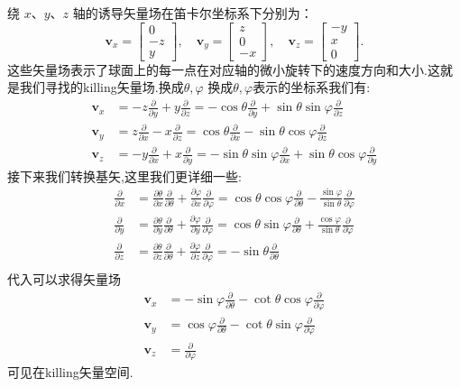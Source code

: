 \documentclass[../main.tex]{subfiles}
\begin{document}
绕 \(x\)、\(y\)、\(z\) 轴的诱导矢量场在笛卡尔坐标系下分别为：
\[
	\bm{v}_x = \begin{bmatrix}
		0  \\
		-z \\
		y
	\end{bmatrix}, \quad
	\bm{v}_y = \begin{bmatrix}
		z \\
		0 \\
		-x
	\end{bmatrix}, \quad
	\bm{v}_z = \begin{bmatrix}
		-y \\
		x  \\
		0
	\end{bmatrix}.
\]
这些矢量场表示了球面上的每一点在对应轴的微小旋转下的速度方向和大小.这就是我们寻找的killing矢量场.换成$\theta,\varphi$
换成$\theta,\varphi$表示的坐标系我们有:
\begin{align*}
	\bm{v}_x & = -z \frac{\partial}{\partial y} + y \frac{\partial}{\partial z}=-\cos \theta \frac{\partial}{\partial y} + \sin\theta \sin\varphi \frac{\partial}{\partial z}               \\
	\bm{v}_y & =  z \frac{\partial}{\partial x} - x \frac{\partial}{\partial z}=\cos \theta \frac{\partial}{\partial x} -\sin \theta \cos \varphi  \frac{\partial}{\partial z}              \\
	\bm{v}_z & = -y \frac{\partial}{\partial x} + x \frac{\partial}{\partial y}=-\sin \theta \sin \varphi \frac{\partial}{\partial x} + \sin\theta \cos \varphi \frac{\partial}{\partial y}
\end{align*}
接下来我们转换基矢,这里我们更详细一些:
\begin{align*}
	\frac{\partial}{\partial x} & = \frac{\partial \theta}{\partial x}\frac{\partial}{\partial \theta}+\frac{\partial \varphi}{\partial x}\frac{\partial}{\partial \varphi}= \cos \theta \cos \varphi \frac{\partial}{\partial \theta}-\frac{\sin \varphi}{\sin \theta}\frac{\partial}{\partial \varphi} \\
	\frac{\partial}{\partial y} & = \frac{\partial \theta}{\partial y}\frac{\partial}{\partial \theta}+\frac{\partial \varphi}{\partial y}\frac{\partial}{\partial \varphi}= \cos \theta \sin \varphi\frac{\partial}{\partial \theta}+\frac{\cos \varphi}{\sin \theta}\frac{\partial}{\partial \varphi}  \\
	\frac{\partial}{\partial z} & = \frac{\partial \theta}{\partial z}\frac{\partial}{\partial \theta}+\frac{\partial \varphi}{\partial z}\frac{\partial}{\partial \varphi}=-\sin \theta \frac{\partial}{\partial \theta}                                                                                \\
\end{align*}
代入可以求得矢量场
\begin{align*}
	\bm{v}_x & =-\sin \varphi \frac{\partial}{\partial \theta} -\cot \theta \cos \varphi\frac{\partial}{\partial \varphi} \\
	\bm{v}_y & = \cos \varphi \frac{\partial}{\partial \theta} -\cot \theta \sin \varphi\frac{\partial}{\partial \varphi} \\
	\bm{v}_z & = \frac{\partial}{\partial \varphi}
\end{align*}可见在killing矢量空间.
\end{document}
